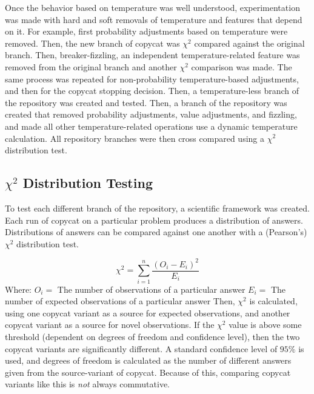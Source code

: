 \documentclass[a4paper]{article}
\begin{document}
        Once the behavior based on temperature was well understood, experimentation was made with hard and soft removals of temperature and features that depend on it.
        For example, first probability adjustments based on temperature were removed.
        Then, the new branch of copycat was $\chi^2$ compared against the original branch.
        Then, breaker-fizzling, an independent temperature-related feature was removed from the original branch and another $\chi^2$ comparison was made.
        The same process was repeated for non-probability temperature-based adjustments, and then for the copycat stopping decision.
        Then, a temperature-less branch of the repository was created and tested.
        Then, a branch of the repository was created that removed probability adjustments, value adjustments, and fizzling, and made all other temperature-related operations use a dynamic temperature calculation.
        All repository branches were then cross compared using a $\chi^2$ distribution test.

    \subsection{$\chi^2$ Distribution Testing}

        To test each different branch of the repository, a scientific framework was created.
        Each run of copycat on a particular problem produces a distribution of answers.
        Distributions of answers can be compared against one another with a (Pearson's) $\chi^2$ distribution test.

        $$\chi^2 = \sum_{i=1}^{n} \frac{(O_i - E_i)^2}{E_i}$$
        Where:
        \newline
        $O_i = $ The number of observations of a particular answer
        \newline
        $E_i = $ The number of expected observations of a particular answer
        \newline
        Then, $\chi^2$ is calculated, using one copycat variant as a source for expected observations, and another copycat variant as a source for novel observations.
        If the $\chi^2$ value is above some threshold (dependent on degrees of freedom and confidence level), then the two copycat variants are significantly different.
        A standard confidence level of $95\%$ is used, and degrees of freedom is calculated as the number of different answers given from the source-variant of copycat.
        Because of this, comparing copycat variants like this is \emph{not} always commutative.
\end{document}
